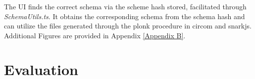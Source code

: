 The UI finds the correct schema via the scheme hash stored, facilitated through \textit{SchemaUtils.ts}. It obtains the corresponding schema from the schema hash and can utilize the files generated through the \acrshort{plonk} procedure in circom and snarkjs. Additional Figures are provided in Appendix \ref{Appendix B}.

\section{Evaluation}


